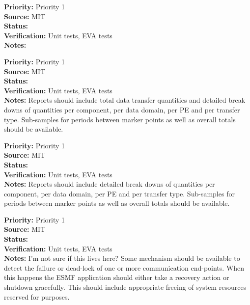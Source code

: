 \begin{reqlist}
{\bf Priority:} Priority 1 \\
{\bf Source:}  MIT \\
{\bf Status:}  \\
{\bf Verification:} Unit tests, EVA tests \\
{\bf Notes:}
\end{reqlist}

\begin{reqlist}
{\bf Priority:} Priority 1 \\
{\bf Source:}  MIT \\
{\bf Status:}  \\
{\bf Verification:} Unit tests, EVA tests \\
{\bf Notes:} Reports should include total data transfer quantities and detailed
break downs of quantities per component, per data domain, per PE and per transfer type.
Sub-samples for periods between marker points as well as overall totals
should be available.
\end{reqlist}

\begin{reqlist}
{\bf Priority:} Priority 1 \\ 
{\bf Source:}  MIT \\
{\bf Status:}  \\
{\bf Verification:} Unit tests, EVA tests \\
{\bf Notes:} Reports should include detailed
break downs of quantities per component, per data domain, per PE and per transfer type.
Sub-samples for periods between marker points as well as overall totals
should be available.
\end{reqlist}


\begin{reqlist}
{\bf Priority:} Priority 1 \\ 
{\bf Source:}  MIT \\
{\bf Status:}  \\
{\bf Verification:} Unit tests, EVA tests \\
{\bf Notes:} I'm not sure if this lives here?
Some mechanism should be available to detect the failure or dead-lock of one or more
communication end-points. When this happens the ESMF application should either
take a recovery action or shutdown gracefully. This should include appropriate 
freeing of system resources reserved for {\bf \shortname} purposes.
\end{reqlist}

